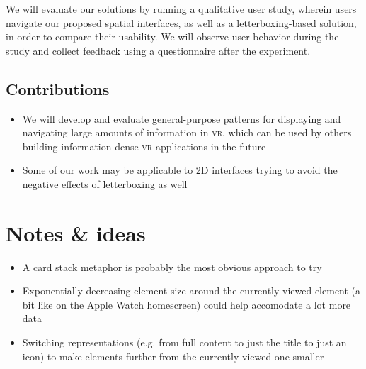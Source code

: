 We will evaluate our solutions by running a qualitative user study, wherein users navigate our proposed spatial interfaces, as well as a letterboxing-based solution, in order to compare their usability. We will observe user behavior during the study and collect feedback using a questionnaire after the experiment.

\subsection{Contributions}
\begin{itemize}
  \setlength\itemsep{.1em}
  \item We will develop and evaluate general-purpose patterns for displaying and navigating large amounts of information in \textsc{vr}, which can be used by others building information-dense \textsc{vr} applications in the future
	\item Some of our work may be applicable to 2D interfaces trying to avoid the negative effects of letterboxing as well
\end{itemize}


\section{Notes \& ideas}
\begin{itemize}
  \setlength\itemsep{.1em}
	\item A card stack metaphor is probably the most obvious approach to try
	\item Exponentially decreasing element size around the currently viewed element (a bit like on the Apple Watch homescreen) could help accomodate a lot more data
	\item Switching representations (e.g. from full content to just the title to just an icon) to make elements further from the currently viewed one smaller
\end{itemize}





